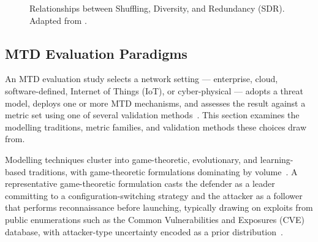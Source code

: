 \begin{figure}[t]
\centering
{}
\caption{Relationships between Shuffling, Diversity, and Redundancy (SDR). Adapted from \cite[Fig.~4]{cho2020}.}
\label{fig:sdr-relationships}
\end{figure}



\subsection{MTD Evaluation Paradigms}
\label{subsec:mtd_eval}

An MTD evaluation study selects a network setting --- enterprise, cloud,
software-defined, Internet of Things (IoT), or cyber-physical --- adopts a
threat model, deploys one or more MTD mechanisms, and assesses the result
against a metric set using one of several validation methods~\cite{cho2020}.
This section examines the modelling traditions, metric families, and
validation methods these choices draw from.

Modelling techniques cluster into game-theoretic, evolutionary, and
learning-based traditions, with game-theoretic formulations dominating by
volume~\cite{cho2020}. A representative game-theoretic formulation casts the
defender as a leader committing to a configuration-switching strategy and the
attacker as a follower that performs reconnaissance before launching, typically
drawing on exploits from public enumerations such as the Common Vulnerabilities
and Exposures (CVE) database, with attacker-type uncertainty encoded as a prior
distribution~\cite{cho2020}.

